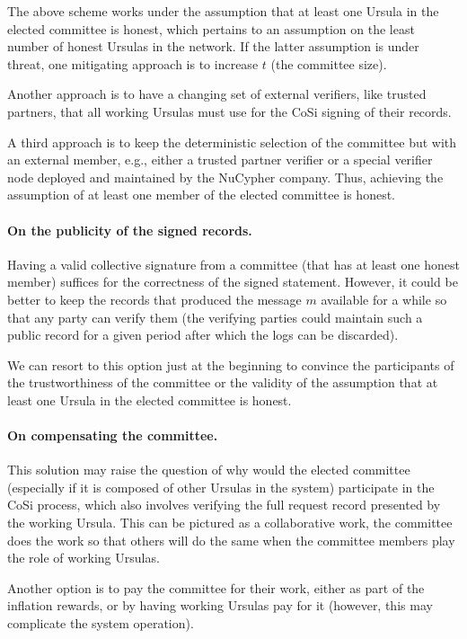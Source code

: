 The above scheme works under the assumption that at least one Ursula
in the elected committee is honest, which pertains to an assumption on the
least number of honest Ursulas in the network. If the latter assumption is under threat, one mitigating approach is to increase $t$ (the committee size).


Another approach is to have a changing set of external verifiers, like
trusted partners, that all working Ursulas must use for the CoSi signing
of their records.


A third approach is to keep the deterministic selection of the committee
but with an external member, e.g., either a trusted partner verifier
or a special verifier node deployed and maintained by the NuCypher company.
Thus, achieving the assumption of at least one member of the elected
committee is honest.


\paragraph{On the publicity of the signed records.} Having a 
valid collective signature from a committee (that has at least one honest 
member) suffices for the correctness of the signed statement. However, 
it could be better to keep the records that produced the message $m$  
available for a while so that any party can verify them (the verifying
parties could maintain such a public record for a given period after which
the logs can be discarded). 


We can resort to this option just at the beginning to convince the 
participants of the trustworthiness of the committee or the validity of the
assumption that at least one Ursula in the elected committee is honest.


\paragraph{On compensating the committee.} This solution may 
raise the question of why would the elected committee (especially if it 
is composed of other Ursulas in the system) participate in the CoSi 
process, which also involves verifying the full request record presented 
by the working Ursula. This can be pictured as a collaborative
work, the committee does the work so that others will do the same
when the committee members play the role of working Ursulas.


Another option is to pay the committee for their work, either as
part of the inflation rewards, or by having working Ursulas pay for 
it (however, this may complicate the system operation).


